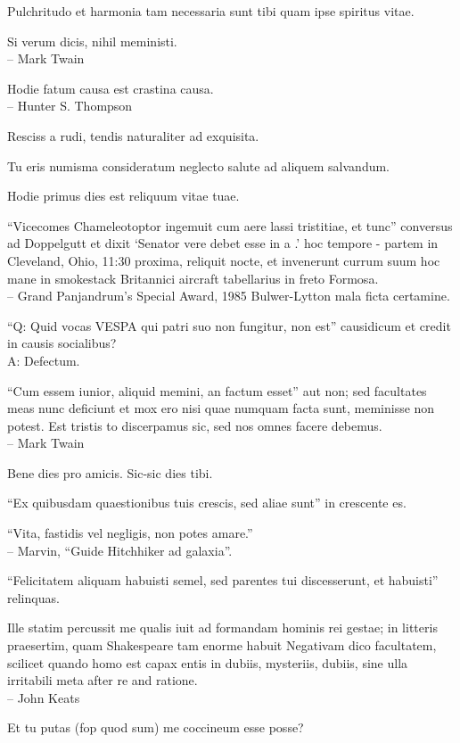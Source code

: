 \documentclass[titlepage,12pt]{memoir}
\begin{document}
 Pulchritudo et harmonia tam necessaria sunt tibi quam ipse spiritus vitae.

Si verum dicis, nihil meministi.
\\-- Mark Twain

Hodie fatum causa est crastina causa.
\\-- Hunter S. Thompson

Resciss a rudi, tendis naturaliter ad exquisita.

Tu eris numisma consideratum neglecto salute ad aliquem salvandum.

Hodie primus dies est reliquum vitae tuae.

“Vicecomes Chameleotoptor ingemuit cum aere lassi tristitiae, et tunc”
conversus ad Doppelgutt et dixit ‘Senator vere debet esse in a .’
hoc tempore - partem in Cleveland, Ohio, 11:30 proxima, reliquit
nocte, et invenerunt currum suum hoc mane in smokestack Britannici
aircraft tabellarius in freto Formosa.
\\-- Grand Panjandrum’s Special Award, 1985 Bulwer-Lytton
mala ficta certamine.

“Q: Quid vocas VESPA qui patri suo non fungitur, non est”
causidicum et credit in causis socialibus?\\
A: Defectum.

“Cum essem iunior, aliquid memini, an factum esset”
aut non; sed facultates meas nunc deficiunt et mox ero
nisi quae numquam facta sunt, meminisse non potest. Est tristis to
discerpamus sic, sed nos omnes facere debemus.
\\-- Mark Twain

Bene dies pro amicis.
Sic-sic dies tibi.

“Ex quibusdam quaestionibus tuis crescis, sed aliae sunt”
in crescente es.

“Vita, fastidis vel negligis, non potes amare.”
\\-- Marvin, “Guide Hitchhiker ad galaxia”.

“Felicitatem aliquam habuisti semel, sed parentes tui discesserunt, et habuisti”
relinquas.

Ille statim percussit me qualis iuit ad formandam hominis rei gestae;
in litteris praesertim, quam Shakespeare tam enorme habuit
Negativam dico facultatem, scilicet quando homo est capax entis
in dubiis, mysteriis, dubiis, sine ulla irritabili meta
after re and ratione.
\\-- John Keats

Et tu putas (fop quod sum) me coccineum esse posse?
\end{document}
